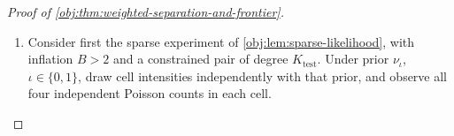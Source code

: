 \documentclass[11pt]{article}
\begin{document}
\begin{proof}[Proof of \cref{obj:thm:weighted-separation-and-frontier}]
\begin{enumerate}
Here is the likelihood calibration used in both large-alphabet constructions. For integers \(K_{\mathrm{test}}\ge1\) and real \(\tau\ge0\), define
\[
\mathcal T_{K_{\mathrm{test}}}(\tau)
=\sum_{\ell>K_{\mathrm{test}}}\frac{\tau^\ell}{\ell!},
\qquad
\beta_{\mathrm{tail}}=\frac1{16e}.
\]
When \(\tau\le\beta_{\mathrm{tail}}K_{\mathrm{test}}\), the factorial bound
\(\ell!\ge(\ell/e)^\ell\) gives, for \(\ell>K_{\mathrm{test}}\),
\[
\frac{\tau^\ell}{\ell!}
\le\left(\frac{e\tau}{\ell}\right)^\ell
\le4^{-\ell}.
\]
Summing the geometric tail therefore gives
\[
\mathcal T_{K_{\mathrm{test}}}(\tau)
\le4^{-K_{\mathrm{test}}},
\qquad
\sqrt{\mathcal T_{K_{\mathrm{test}}}(\tau)}
\le2^{-K_{\mathrm{test}}}.
\]
Define
\[
C_{\mathrm{tv}}=\frac{|\log8|+2}{\log2}.
\]
If \(K_{\mathrm{test}}\ge C_{\mathrm{tv}}L_d\), then
\[
K_{\mathrm{test}}\log2
\ge(|\log8|+2)(1+\log d)
\ge\log(8d),
\]
and consequently
\[
d\sqrt{\mathcal T_{K_{\mathrm{test}}}(\tau)}
\le d\,2^{-K_{\mathrm{test}}}\le\frac18.
\]

\item
Consider first the sparse experiment of
\cref{obj:lem:sparse-likelihood}, with inflation \(B>2\) and a constrained pair of degree \(K_{\mathrm{test}}\). Under prior \(\nu_\iota\), \(\iota\in\{0,1\}\), draw cell intensities independently with that prior, and observe all four independent Poisson counts in each cell.


\end{enumerate}
\end{proof}
\end{document}
